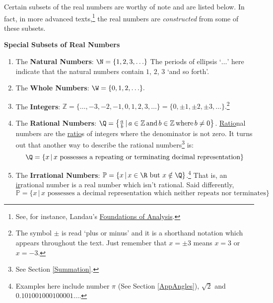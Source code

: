 \documentclass{ximera}
\begin{document}
\medskip

Certain subsets of the real numbers are worthy of note and are listed below.  In fact, in more advanced texts,\footnote{See, for instance, Landau's \underline{Foundations of Analysis}.}   the real numbers are \textit{constructed} from some of these subsets.  

\medskip

\label{setsofnumbersboxonthispage}

\colorbox{ResultColor}{\bbm

\centerline{\textbf{Special Subsets of Real Numbers}}

\begin{enumerate}

\item The \textbf{Natural Numbers}: $\N= \{ 1, 2, 3,  \ldots\}$ The periods of ellipsis `$\ldots$' here indicate that the natural numbers contain $1$, $2$, $3$ `and so forth'.

\item The \textbf{Whole Numbers}: $\W = \{ 0, 1, 2, \ldots \}.$

\item The \textbf{Integers}: $\mathbb Z=\{ \ldots, -3, -2, -1, 0, 1, 2, 3, \ldots \} = \{ 0, \pm 1, \pm 2, \pm 3, \ldots\}.$\footnote{The symbol $\pm$ is read `plus or minus' and it is a shorthand notation which appears throughout the text.  Just remember that $x = \pm 3$ means $x = 3$ or $x = -3$.}

\item The \textbf{Rational Numbers}: $\Q=\left\{\frac{a}{b} \, | \, a \in \mathbb Z \, \mbox{and} \, b \in \mathbb Z \, \mbox{where} \, b \neq 0\right\}$.  \underline{Ratio}nal numbers are the \underline{ratio}s of integers where the denominator is not zero.  It turns out that another way to describe the rational numbers\footnote{See Section \ref{Summation}.} is: \[\Q=\{x\,|\,\mbox{$x$ possesses a repeating or terminating decimal representation}\}\]

\item The \textbf{Irrational Numbers}: $\mathbb P = \{x\,|\,\mbox{$x \in \R$ but $x \notin \Q$}\}$.\footnote{Examples here include number $\pi$ (See Section \ref{AppAngles}), $\sqrt{2}$ and $0.101001000100001\ldots$.}  That is, an \underline{ir}rational number is a real number which isn't rational.  Said differently, \[\mathbb P = \{x\,|\,\mbox{$x$ possesses a decimal representation which neither repeats nor terminates}\}\]

\end{enumerate}

\ebm}
\end{document}
